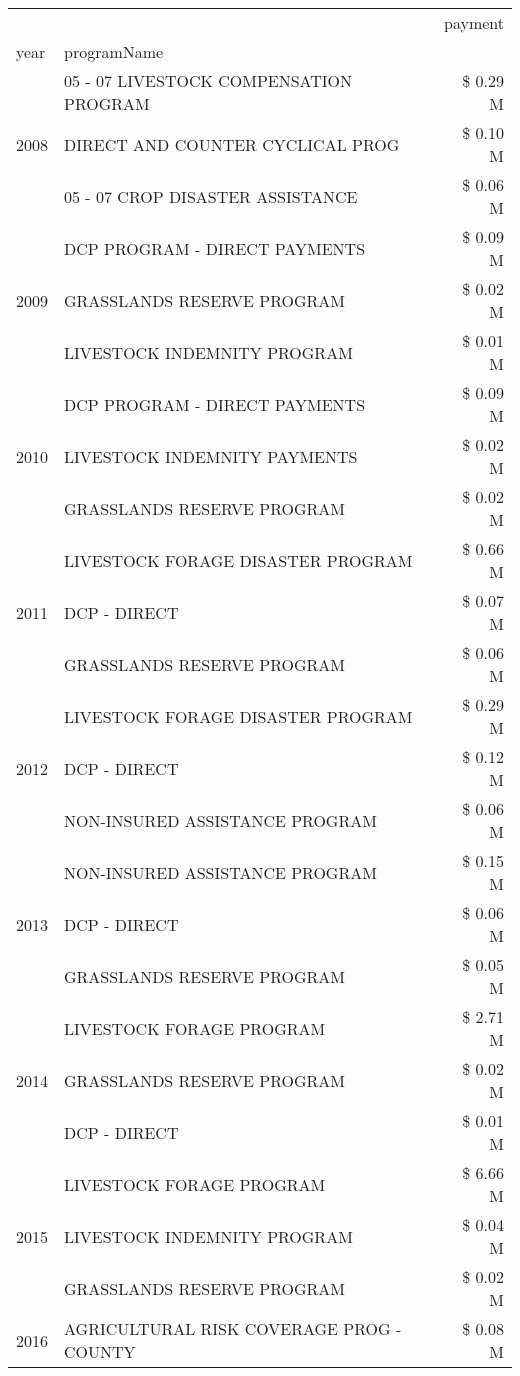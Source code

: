 \begin{tabular}{llr}
\toprule
 &  & payment \\
year & programName &  \\
\midrule
\multirow[t]{3}{*}{2008} & 05 - 07 LIVESTOCK COMPENSATION PROGRAM & \$ 0.29 M \\
 & DIRECT AND COUNTER CYCLICAL PROG & \$ 0.10 M \\
 & 05 - 07 CROP DISASTER ASSISTANCE & \$ 0.06 M \\
\cline{1-3}
\multirow[t]{3}{*}{2009} & DCP PROGRAM - DIRECT PAYMENTS & \$ 0.09 M \\
 & GRASSLANDS RESERVE PROGRAM & \$ 0.02 M \\
 & LIVESTOCK INDEMNITY PROGRAM & \$ 0.01 M \\
\cline{1-3}
\multirow[t]{3}{*}{2010} & DCP PROGRAM - DIRECT PAYMENTS & \$ 0.09 M \\
 & LIVESTOCK INDEMNITY PAYMENTS & \$ 0.02 M \\
 & GRASSLANDS RESERVE PROGRAM & \$ 0.02 M \\
\cline{1-3}
\multirow[t]{3}{*}{2011} & LIVESTOCK FORAGE DISASTER PROGRAM & \$ 0.66 M \\
 & DCP - DIRECT & \$ 0.07 M \\
 & GRASSLANDS RESERVE PROGRAM & \$ 0.06 M \\
\cline{1-3}
\multirow[t]{3}{*}{2012} & LIVESTOCK FORAGE DISASTER PROGRAM & \$ 0.29 M \\
 & DCP - DIRECT & \$ 0.12 M \\
 & NON-INSURED ASSISTANCE PROGRAM & \$ 0.06 M \\
\cline{1-3}
\multirow[t]{3}{*}{2013} & NON-INSURED ASSISTANCE PROGRAM & \$ 0.15 M \\
 & DCP - DIRECT & \$ 0.06 M \\
 & GRASSLANDS RESERVE PROGRAM & \$ 0.05 M \\
\cline{1-3}
\multirow[t]{3}{*}{2014} & LIVESTOCK FORAGE PROGRAM & \$ 2.71 M \\
 & GRASSLANDS RESERVE PROGRAM & \$ 0.02 M \\
 & DCP - DIRECT & \$ 0.01 M \\
\cline{1-3}
\multirow[t]{3}{*}{2015} & LIVESTOCK FORAGE PROGRAM & \$ 6.66 M \\
 & LIVESTOCK INDEMNITY PROGRAM & \$ 0.04 M \\
 & GRASSLANDS RESERVE PROGRAM & \$ 0.02 M \\
\cline{1-3}
\multirow[t]{3}{*}{2016} & AGRICULTURAL RISK COVERAGE PROG - COUNTY & \$ 0.08 M \\

\end{tabular}
